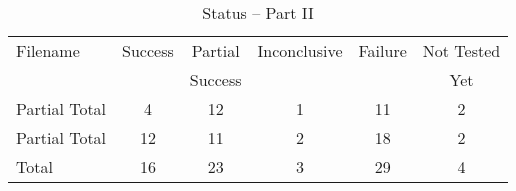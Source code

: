 \begin{table}[H]
\centering
\begin{tabular}{|l|c|c|c|c|c|}
\hline
Filename                & Success       & Partial       & Inconclusive  & Failure       & Not Tested    \\
                        &               & Success       &               &               & Yet           \\ \hline \hline
Partial Total           &     4         &       12      &       1       &       11      &       2       \\ \hline
Partial Total           &     12        &       11      &       2       &       18      &       2       \\ \hline \hline
Total                   &     16        &       23      &       3       &       29      &       4       \\ \hline \hline
\end{tabular}
\caption{\label{tab:nc_test4_status_3} Status -- Part II}
\end{table}
